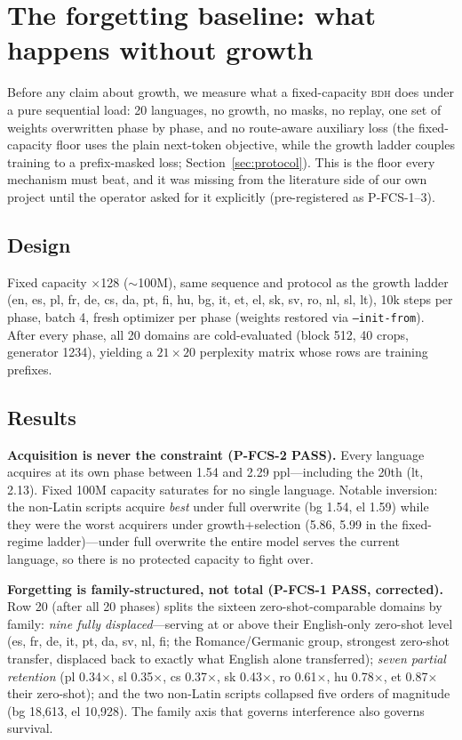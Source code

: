 \documentclass[11pt]{article}
\theoremstyle{definition}\newtheorem{definition}{Definition}
\theoremstyle{remark}\newtheorem{remark}{Remark}
\newcommand{\BDH}{\textsc{bdh}}
\begin{document}
\section{The forgetting baseline: what happens without growth}
\label{sec:fcs}

Before any claim about growth, we measure what a fixed-capacity \BDH{} does under a
pure sequential load: 20 languages, no growth, no masks, no replay, one set of weights
overwritten phase by phase, and no route-aware auxiliary loss (the fixed-capacity floor uses the plain next-token objective, while the growth ladder couples training to a prefix-masked loss; Section~\ref{sec:protocol}). This is the floor every mechanism must beat, and it was
missing from the literature side of our own project until the operator asked for it
explicitly (pre-registered as P-FCS-1--3).

\subsection{Design}

Fixed capacity $\times$128 ($\sim$100M), same sequence and protocol as the growth ladder
(en, es, pl, fr, de, cs, da, pt, fi, hu, bg, it, et, el, sk, sv, ro, nl, sl, lt), 10k steps
per phase, batch 4, fresh optimizer per phase (weights restored via \texttt{--init-from}).
After every phase, all 20 domains are cold-evaluated (block 512, 40 crops, generator
1234), yielding a $21\times 20$ perplexity matrix whose rows are training prefixes.

\subsection{Results}

\textbf{Acquisition is never the constraint (P-FCS-2 PASS).} Every language acquires at
its own phase between 1.54 and 2.29 ppl---including the 20th (lt, 2.13). Fixed 100M capacity
saturates for no single language. Notable inversion: the non-Latin scripts acquire \emph{best}
under full overwrite (bg 1.54, el 1.59) while they were the worst acquirers under
growth+selection (5.86, 5.99 in the fixed-regime ladder)---under full overwrite the entire
model serves the current language, so there is no protected capacity to fight over.

\textbf{Forgetting is family-structured, not total (P-FCS-1 PASS, corrected).} Row 20
(after all 20 phases) splits the sixteen zero-shot-comparable domains by family:
\emph{nine fully displaced}---serving at or above their English-only zero-shot level (es,
fr, de, it, pt, da, sv, nl, fi; the Romance/Germanic group, strongest zero-shot transfer,
displaced back to exactly what English alone transferred); \emph{seven partial retention}
(pl 0.34$\times$, sl 0.35$\times$, cs 0.37$\times$, sk 0.43$\times$, ro 0.61$\times$,
hu 0.78$\times$, et 0.87$\times$ their zero-shot); and the two non-Latin scripts collapsed
five orders of magnitude (bg 18{,}613, el 10{,}928). The family axis that governs
interference also governs survival.
\end{document}
